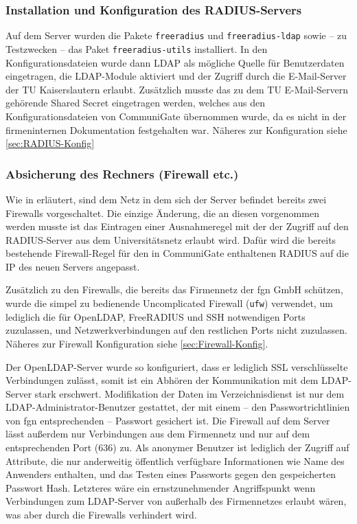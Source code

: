 \documentclass[11pt,a4paper,titlepage=firstiscover,headsepline,bibtotoc]{scrartcl} %
\begin{document}
\subsubsection{Installation und Konfiguration des RADIUS-Servers}\label{sec:RADIUS-Konf}
Auf dem Server wurden die Pakete \texttt{freeradius} und \texttt{freeradius-ldap} sowie -- zu Testzwecken -- das Paket \texttt{freeradius-utils} installiert. In den Konfigurationsdateien wurde dann LDAP als mögliche Quelle für Benutzerdaten eingetragen, die LDAP-Module aktiviert und der Zugriff durch die E-Mail-Server der TU Kaiserslautern erlaubt. Zusätzlich musste das zu dem TU E-Mail-Servern gehörende Shared Secret eingetragen werden, welches aus den Konfigurationsdateien von CommuniGate übernommen wurde, da es nicht in der firmeninternen Dokumentation festgehalten war. Näheres zur Konfiguration siehe \autoref{sec:RADIUS-Konfig}

\subsubsection{Absicherung des Rechners (Firewall etc.)}
Wie in  erläutert, sind dem Netz in dem sich der Server befindet bereits zwei Firewalls vorgeschaltet. Die einzige Änderung, die an diesen vorgenommen werden musste ist das Eintragen einer Ausnahmeregel mit der der Zugriff auf den RADIUS-Server aus dem Universitätsnetz erlaubt wird. Dafür wird die bereits bestehende Firewall-Regel für den in CommuniGate enthaltenen RADIUS auf die IP des neuen Servers angepasst.

Zusätzlich zu den Firewalls, die bereits das Firmennetz der fgn GmbH schützen, wurde die simpel zu bedienende Uncomplicated Firewall (\texttt{ufw}) verwendet, um lediglich die für OpenLDAP, FreeRADIUS und SSH notwendigen Ports zuzulassen, und Netzwerkverbindungen auf den restlichen Ports nicht zuzulassen. Näheres zur Firewall Konfiguration siehe \autoref{sec:Firewall-Konfig}.

Der OpenLDAP-Server wurde so konfiguriert, dass er lediglich SSL verschlüsselte Verbindungen zulässt, somit ist ein Abhören der Kommunikation mit dem LDAP-Server stark erschwert. Modifikation der Daten im Verzeichnisdienst ist nur dem LDAP-Administrator-Benutzer gestattet, der mit einem -- den Passwortrichtlinien von fgn entsprechenden -- Passwort gesichert ist. Die Firewall auf dem Server lässt außerdem nur Verbindungen aus dem Firmennetz und nur auf dem entsprechenden Port (636) zu. Als anonymer Benutzer ist lediglich der Zugriff auf Attribute, die nur anderweitig öffentlich verfügbare Informationen wie Name des Anwenders enthalten, und das Testen eines Passworts gegen den gespeicherten Passwort Hash. Letzteres wäre ein ernstzunehmender Angriffspunkt wenn Verbindungen zum LDAP-Server von außerhalb des Firmennetzes erlaubt wären, was aber durch die Firewalls verhindert wird.
\end{document}
